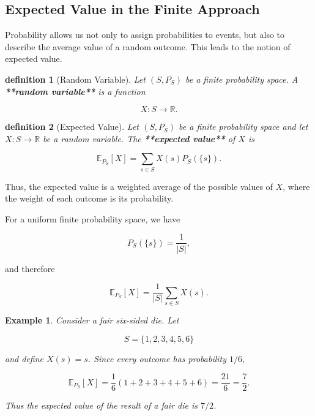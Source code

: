 \documentclass[10pt,a4paper]{book}
\newtheorem{definition}{definition}[section]
\newtheorem{example}{Example}[section]
\begin{document}
\subsection{Expected Value in the Finite Approach}

Probability allows us not only to assign probabilities to events, but also to describe the average value of a random outcome. This leads to the notion of expected value.

\begin{definition}[Random Variable]

    Let $(S,P_S)$ be a finite probability space. A \textbf{**random variable**} is a function

    $$
        X:S\to\mathbb R.
    $$

\end{definition}

\begin{definition}[Expected Value]

    Let $(S,P_S)$ be a finite probability space and let $X:S\to\mathbb R$ be a random variable. The \textbf{**expected value**} of $X$ is

    $$
        \mathbb E_{P_S}[X]
        =
        \sum_{s\in S}X(s)P_S(\{s\}).
    $$

\end{definition}

Thus, the expected value is a weighted average of the possible values of $X$, where the weight of each outcome is its probability.

For a uniform finite probability space, we have

$$
    P_S(\{s\})=\frac1{|S|},
$$

and therefore

$$
    \mathbb E_{P_S}[X]
    =
    \frac1{|S|}
    \sum_{s\in S}X(s).
$$

\begin{example}

    Consider a fair six-sided die. Let

    $$
        S=\{1,2,3,4,5,6\}
    $$

    and define $X(s)=s$. Since every outcome has probability $1/6$,

    $$
        \mathbb E_{P_S}[X]
        =
        \frac16(1+2+3+4+5+6)
        =
        \frac{21}{6}
        =
        \frac72.
    $$

    Thus the expected value of the result of a fair die is $7/2$.
\end{example}
\end{document}
